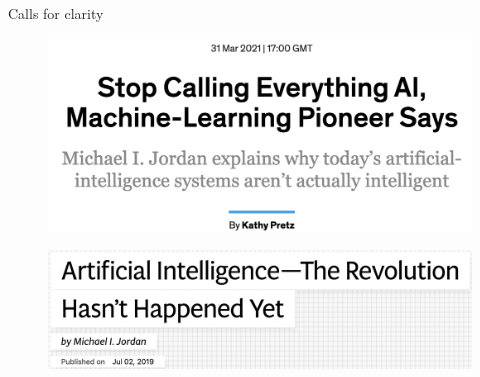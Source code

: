 \documentclass{beamer}
\begin{document}
\begin{frame}{Calls for clarity}
\begin{figure}
\centering
\captionsetup{justification=centering}
\includegraphics[scale=0.30]{AInotML1.png}
\end{figure}
\begin{figure}
\centering
\captionsetup{justification=centering}
\includegraphics[scale=0.30]{AInotML2.png}
\end{figure}
\end{frame}
\end{document}
